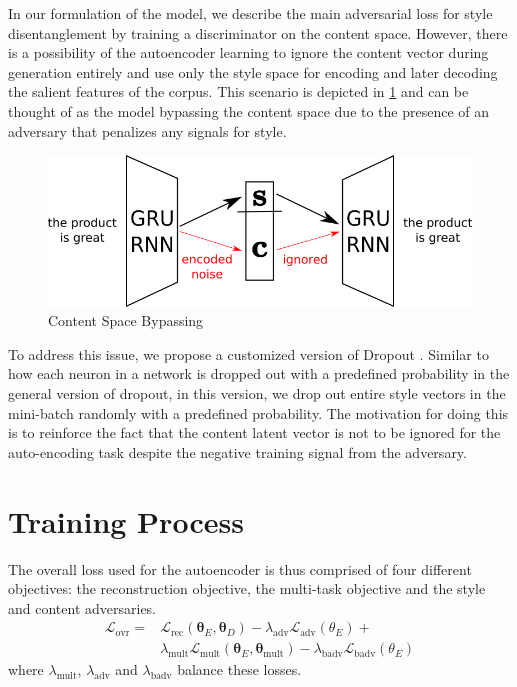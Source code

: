 In our formulation of the model, we describe the main adversarial loss for style disentanglement by training a discriminator on the content space. However, there is a possibility of the autoencoder learning to ignore the content vector during generation entirely and use only the style space for encoding and later decoding the salient features of the corpus. This scenario is depicted in \ref{fig:model-content-bypass} and can be thought of as the model bypassing the content space due to the presence of an adversary that penalizes any signals for style.

\begin{figure}[ht]
	\centering
	\includegraphics[width=\linewidth]{images/model-content-bypass}
	\caption{Content Space Bypassing}
	\label{fig:model-content-bypass}
\end{figure}

To address this issue, we propose a customized version of Dropout \citep{srivastava2014dropout}. Similar to how each neuron in a network is dropped out with a predefined probability in the general version of dropout, in this version, we drop out entire style vectors in the mini-batch randomly with a predefined probability. The motivation for doing this is to reinforce the fact that the content latent vector is not to be ignored for the auto-encoding task despite the negative training signal from the adversary.


\section{Training Process}

The overall loss used for the autoencoder is thus comprised of four different objectives: the reconstruction objective, the multi-task objective and the style and content adversaries.
\begin{align*}
	\mathcal{L}_\text{ovr} =
	 & \mathcal{L}_\text{rec}(\bm\theta_E, \bm\theta_D) - \lambda_\text{adv} \mathcal{L}_\text{adv}(\theta_E) +                                \\
	 & \lambda_\text{mult} \mathcal{L}_\text{mult} (\bm\theta_E,\bm\theta_\text{mult}) - \lambda_\text{badv} \mathcal{L}_\text{badv}(\theta_E)
\end{align*}
where $\lambda_\text{mult}$, $\lambda_\text{adv}$ and $\lambda_\text{badv}$ balance these losses.

